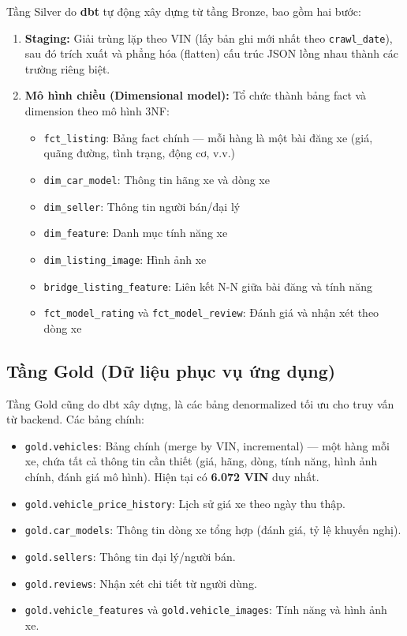 Tầng Silver do \textbf{dbt} tự động xây dựng từ tầng Bronze, bao gồm hai bước:
\begin{enumerate}
    \item \textbf{Staging:} Giải trùng lặp theo VIN (lấy bản ghi mới nhất theo \texttt{crawl\_date}), sau đó trích xuất và phẳng hóa (flatten) cấu trúc JSON lồng nhau thành các trường riêng biệt.
    \item \textbf{Mô hình chiều (Dimensional model):} Tổ chức thành bảng fact và dimension theo mô hình 3NF:
    \begin{itemize}
        \item \texttt{fct\_listing}: Bảng fact chính — mỗi hàng là một bài đăng xe (giá, quãng đường, tình trạng, động cơ, v.v.)
        \item \texttt{dim\_car\_model}: Thông tin hãng xe và dòng xe
        \item \texttt{dim\_seller}: Thông tin người bán/đại lý
        \item \texttt{dim\_feature}: Danh mục tính năng xe
        \item \texttt{dim\_listing\_image}: Hình ảnh xe
        \item \texttt{bridge\_listing\_feature}: Liên kết N-N giữa bài đăng và tính năng
        \item \texttt{fct\_model\_rating} và \texttt{fct\_model\_review}: Đánh giá và nhận xét theo dòng xe
    \end{itemize}
\end{enumerate}

\subsection{Tầng Gold (Dữ liệu phục vụ ứng dụng)}

Tầng Gold cũng do dbt xây dựng, là các bảng denormalized tối ưu cho truy vấn từ backend. Các bảng chính:
\begin{itemize}
    \item \texttt{gold.vehicles}: Bảng chính (merge by VIN, incremental) — một hàng mỗi xe, chứa tất cả thông tin cần thiết (giá, hãng, dòng, tính năng, hình ảnh chính, đánh giá mô hình). Hiện tại có \textbf{6.072 VIN} duy nhất.
    \item \texttt{gold.vehicle\_price\_history}: Lịch sử giá xe theo ngày thu thập.
    \item \texttt{gold.car\_models}: Thông tin dòng xe tổng hợp (đánh giá, tỷ lệ khuyến nghị).
    \item \texttt{gold.sellers}: Thông tin đại lý/người bán.
    \item \texttt{gold.reviews}: Nhận xét chi tiết từ người dùng.
    \item \texttt{gold.vehicle\_features} và \texttt{gold.vehicle\_images}: Tính năng và hình ảnh xe.
\end{itemize}

